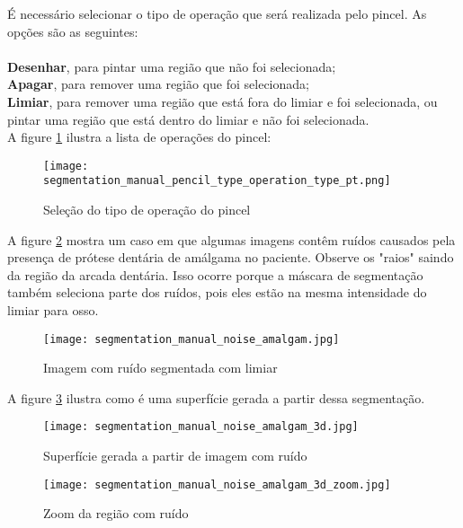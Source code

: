É necessário selecionar o tipo de operação que será realizada pelo pincel. As opções são as
seguintes:\\
\\
\textbf{Desenhar}, para pintar uma região que não foi selecionada;\\
\textbf{Apagar}, para remover uma região que foi selecionada;\\
\textbf{Limiar}, para remover uma região que está fora do limiar e foi selecionada, ou pintar
uma região que está dentro do limiar e não foi selecionada.\\

A figure \ref{fig:select_brush_operations} ilustra a lista de operações do pincel:

\begin{figure}[!htb]
\centering
\texttt{[image: segmentation\_manual\_pencil\_type\_operation\_type\_pt.png]}
\caption{Seleção do tipo de operação do pincel}
\label{fig:select_brush_operations}
\end{figure}

A figure \ref{fig:noise_amalgaman} mostra um caso em que algumas imagens contêm ruídos
causados pela presença de prótese dentária de amálgama no paciente. Observe os "raios" 
saindo da região da arcada dentária. Isso ocorre porque a máscara de segmentação também
seleciona parte dos ruídos, pois eles estão na mesma intensidade do limiar para osso.

\begin{figure}[!htb]
\centering
\texttt{[image: segmentation\_manual\_noise\_amalgam.jpg]}
\caption{Imagem com ruído segmentada com limiar}
\label{fig:noise_amalgaman}
\end{figure}

A figure \ref{fig:surface_amagaman} ilustra como é uma superfície gerada a partir dessa
segmentação.

\begin{figure}[!htb]
\centering
\texttt{[image: segmentation\_manual\_noise\_amalgam\_3d.jpg]}
\caption{Superfície gerada a partir de imagem com ruído}
\label{fig:surface_amagaman}
\end{figure}

\begin{figure}[!htb]
\centering
\texttt{[image: segmentation\_manual\_noise\_amalgam\_3d\_zoom.jpg]}
\caption{Zoom da região com ruído}
\label{fig:surface_amagaman_zoom}
\end{figure}

\newpage

